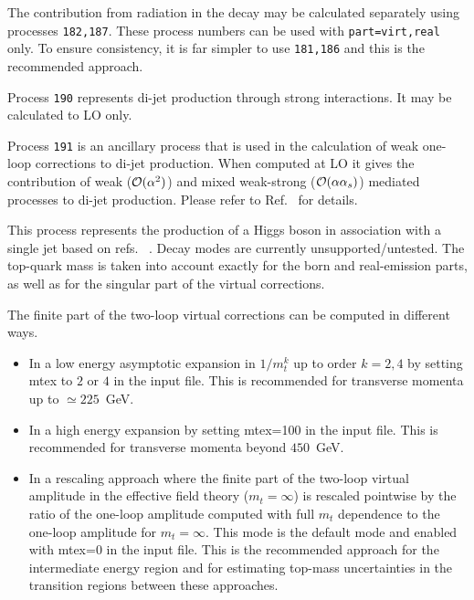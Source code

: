 The contribution from radiation in the decay may be calculated separately using
processes {\tt 182,187}. These process numbers can be used with {\tt part=virt,real}
only. To ensure consistency, it is far simpler to use {\tt 181,186}
and this is the recommended approach.

\label{subsec:dijet}

Process {\tt 190} represents di-jet production through strong interactions.
It may be calculated to LO only.

Process {\tt 191} is an ancillary process that is used in the calculation of
weak one-loop corrections to di-jet production.  When computed at LO it gives the
contribution of weak (${\cal O}(\alpha^2)$) and mixed weak-strong (${\cal O}(\alpha\alpha_s)$)
mediated processes to di-jet production.  Please refer to Ref.~\cite{Campbell:2016dks} for details.

\label{subsec:hjetma}
This process represents the production of a Higgs boson in association with a single jet based on refs.~ 
\cite{Neumann:2016dny,Neumann:2018bsx,Budge:2020oyl}. Decay modes are currently unsupported/untested. The top-quark mass is taken 
into account 
exactly for the born and real-emission parts, as well as for the singular part of the virtual corrections.

The finite part of the two-loop virtual corrections can be computed in different ways.
\begin{itemize}
    \item In a low energy asymptotic expansion in $1/m_t^k$ up to order $k=2,4$ by setting mtex to $2$ or $4$ in the 
    input file. This is recommended for transverse momenta up to $\simeq 225$~GeV.
    \item In a high energy expansion by setting mtex=100 in the input file. This is recommended for transverse momenta 
    beyond $450$~GeV.
    \item In a rescaling approach where the finite part of the two-loop virtual amplitude in the effective field theory 
    ($m_t=\infty$) is rescaled pointwise by the ratio of the one-loop amplitude computed with full $m_t$ dependence to 
    the one-loop amplitude for $m_t=\infty$. This mode is the default mode and enabled with mtex=0 in the input file. 
    This is the recommended approach for the intermediate energy region and for estimating top-mass uncertainties in 
    the transition regions between these approaches.
\end{itemize}

